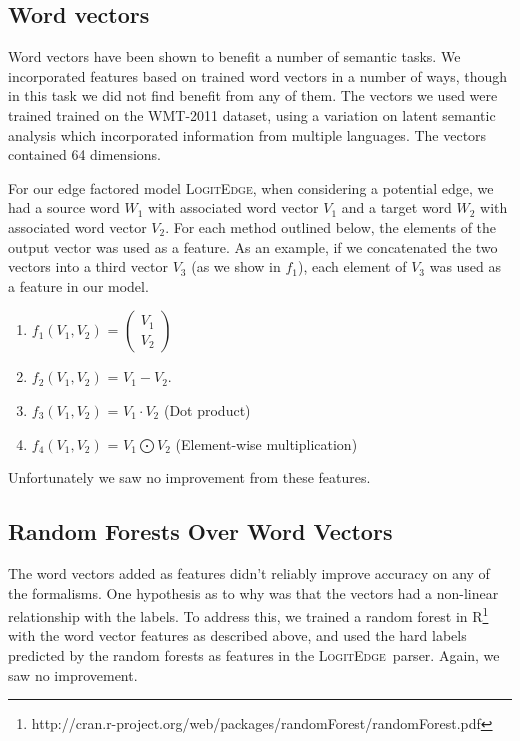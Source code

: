 \documentclass[11pt]{article}
\newcommand{\logitedge}{\textsc{LogitEdge}}
\begin{document}
\subsection{Word vectors}
Word vectors have been shown to benefit a number of semantic tasks. We
incorporated features based on trained word vectors in a number of ways, though
in this task we did not find benefit from any of them.
The vectors we used \cite{wordVectors} were trained trained on the WMT-2011
dataset, using a variation on latent semantic analysis which incorporated
information from multiple languages.
The vectors contained 64 dimensions.

For our edge factored model \logitedge, when considering a potential edge, we
had a source word $W_1$ with associated word vector $V_1$ and a target word
$W_2$ with associated word vector $V_2$.
For each method outlined below, the elements of the output vector was used as a
feature.
As an example, if we concatenated the two vectors into a third vector $V_3$ (as
we show in $f_1$), each element of $V_3$ was used as a feature in our model.

\begin{enumerate}
\item $f_1(V_1,V_2)$ = $ \left( \begin{smallmatrix} V_1\\ V_2 \end{smallmatrix} \right)$
\item $f_2(V_1,V_2)$ = $V_1 - V_2$.
\item $f_3(V_1,V_2)$ = $V_1 \cdot V_2$ (Dot product)
\item $f_4(V_1,V_2)$ = $V_1 \bigodot V_2$ (Element-wise multiplication)
\end{enumerate}
Unfortunately we saw no improvement from these features.

\subsection{Random Forests Over Word Vectors}
The word vectors added as features didn't reliably improve accuracy on any of
the formalisms.
One hypothesis as to why was that the vectors had a non-linear relationship
with the labels.
To address this, we trained a random forest in
R\footnote{http://cran.r-project.org/web/packages/randomForest/randomForest.pdf}
with the word vector features as described above, and used the hard labels
predicted by the random forests as features in the \logitedge\ parser.
Again, we saw no improvement.
\end{document}
